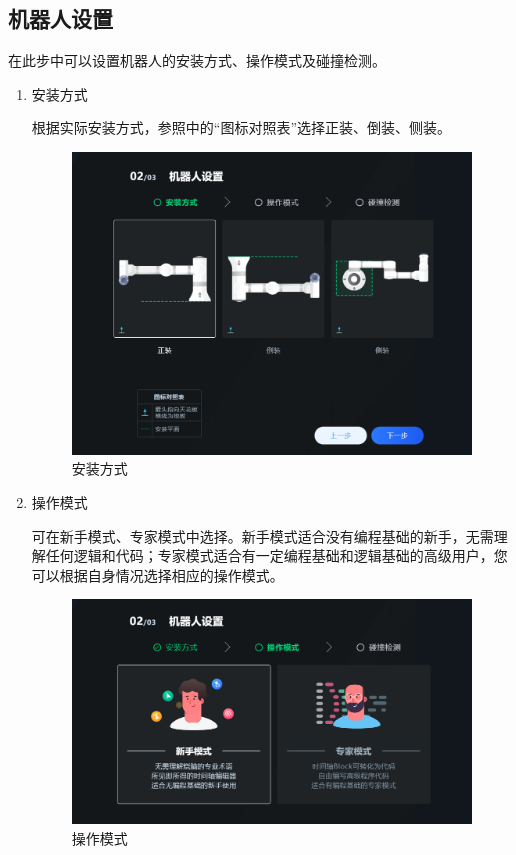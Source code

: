 \subsection{机器人设置}
在此步中可以设置机器人的安装方式、操作模式及碰撞检测。
\begin{enumerate}
\item 安装方式

	根据实际安装方式，参照中的“图标对照表”选择正装、倒装、侧装。

	\begin{figure}[ht]
		\centering
		\includegraphics[width=\textwidth]{screen/2-6.png}
		\caption{安装方式}
		\label{fig:安装方式}
	\end{figure}


\clearpage

\item 操作模式

	可在新手模式、专家模式中选择。新手模式适合没有编程基础的新手，无需理解任何逻辑和代码；专家模式适合有一定编程基础和逻辑基础的高级用户，您可以根据自身情况选择相应的操作模式。

	\begin{figure}[ht]
		\centering
		\includegraphics[width=\textwidth]{screen/2-7.png}
		\caption{操作模式}
		\label{fig:操作模式}
	\end{figure}


\end{enumerate}
